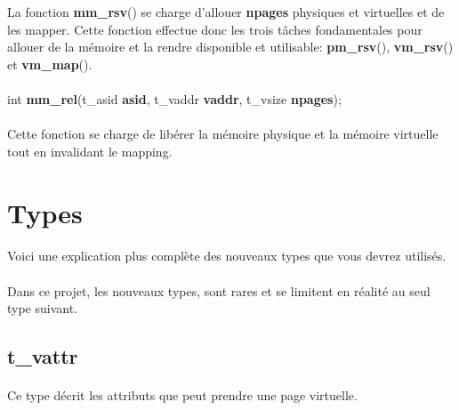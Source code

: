 \documentclass[10pt,a4wide]{article}
\begin{document}
La fonction \textbf{mm\_rsv}() se charge d'allouer \textbf{npages} physiques
et virtuelles et de les mapper. Cette fonction effectue donc les trois
t\^aches fondamentales pour allouer de la m\'emoire et la rendre disponible
et utilisable: \textbf{pm\_rsv}(), \textbf{vm\_rsv}() et \textbf{vm\_map}().

\paragraph{}

\hspace{1.5cm}int \textbf{mm\_rel}(t\_asid \textbf{asid},
                                   t\_vaddr \textbf{vaddr},
                                   t\_vsize \textbf{npages});

\paragraph{}

Cette fonction se charge de lib\'erer la m\'emoire physique et la m\'emoire
virtuelle tout en invalidant le mapping.

\section{Types}

\paragraph{}

Voici une explication plus compl\`ete des nouveaux types que
vous devrez utilis\'es.

\paragraph{}

Dans ce projet, les nouveaux types, sont rares et se limitent en r\'ealit\'e
au seul type suivant.

\subsection{t\_vattr}

\paragraph{}

Ce type d\'ecrit les attributs que peut prendre une page virtuelle.
\end{document}
